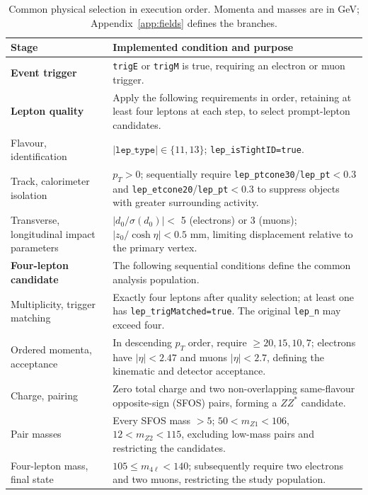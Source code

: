 \documentclass[11pt,a4paper]{article}
\begin{document}
\begin{table}[H]
\caption{Common physical selection in execution order. Momenta and masses are in GeV; Appendix~\ref{app:fields} defines the branches.}
\label{tab:cuts}
\centering\small
\renewcommand{\arraystretch}{1.1}
\begin{tabularx}{\linewidth}{@{}>{\raggedright\arraybackslash}p{.23\linewidth}Y@{}}
\toprule
Stage & Implemented condition and purpose \\
\midrule
\textbf{Event trigger} & \texttt{trigE} or \texttt{trigM} is true, requiring an electron or muon trigger. \\
\midrule
\textbf{Lepton quality} & Apply the following requirements in order, retaining at least four leptons at each step, to select prompt-lepton candidates. \\
Flavour, identification & $|\texttt{lep\_type}|\in\{11,13\}$; \texttt{lep\_isTightID=true}. \\
Track, calorimeter isolation & $p_T>0$; sequentially require \texttt{lep\_ptcone30}/\texttt{lep\_pt}$<0.3$ and
\texttt{lep\_etcone20}/\texttt{lep\_pt}$<0.3$ to suppress objects with greater surrounding activity. \\
Transverse, longitudinal impact parameters & $|d_0/\sigma(d_0)|<$ 5 (electrons) or 3 (muons);
$|z_0/\cosh\eta|<0.5$ mm, limiting displacement relative to the primary vertex. \\
\midrule
\textbf{Four-lepton candidate} & The following sequential conditions define the common analysis population. \\
Multiplicity, trigger matching & Exactly four leptons after quality selection; at least one has \texttt{lep\_trigMatched=true}.
The original \texttt{lep\_n} may exceed four. \\
Ordered momenta, acceptance & In descending $p_T$ order, require $\geq20,15,10,7$;
electrons have $|\eta|<2.47$ and muons $|\eta|<2.7$, defining the kinematic and detector acceptance. \\
Charge, pairing & Zero total charge and two non-overlapping same-flavour opposite-sign (SFOS) pairs, forming a $ZZ^*$ candidate. \\
Pair masses & Every SFOS mass $>5$; $50<m_{Z1}<106$, $12<m_{Z2}<115$, excluding low-mass pairs and restricting the candidates. \\
Four-lepton mass, final state & $105\leq m_{4\ell}<140$; subsequently require two electrons and two muons, restricting the study population. \\
\bottomrule
\end{tabularx}
\end{table}
\end{document}
